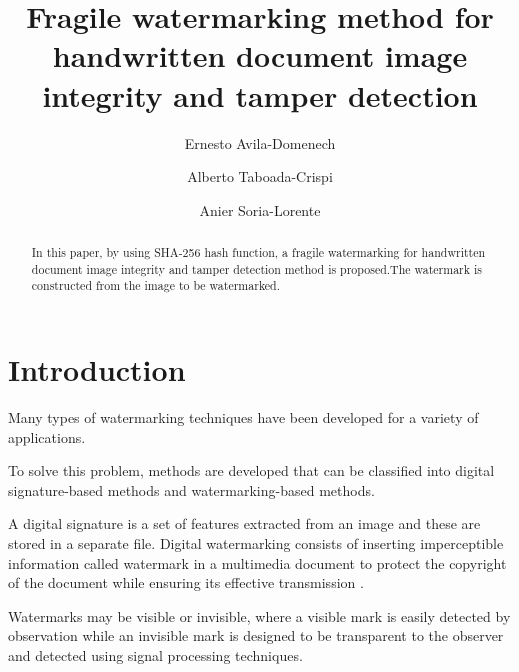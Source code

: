 \documentclass[runningheads]{llncs}
\begin{document}
%
\title{Fragile watermarking method for handwritten document image integrity and tamper detection}
%
%
\author{Ernesto Avila-Domenech \and
Alberto Taboada-Crispi \and
Anier Soria-Lorente}
%
%
%
\maketitle              %
%
\begin{abstract}
In this paper, by using SHA-256 hash function, a fragile watermarking for handwritten document image integrity and tamper detection method is proposed.The watermark is constructed from the image to be watermarked.

\end{abstract}
%
%
%
\section{Introduction}
Many types of watermarking techniques have been developed for a variety of applications.

To solve this problem, methods are developed that can be classified into digital signature-based methods and watermarking-based methods.

A digital signature is a set of features extracted from an image and these are stored in a separate file. Digital watermarking consists of inserting imperceptible information called watermark in a multimedia document to protect the copyright of the document while ensuring its effective transmission \cite{el2014image}.

Watermarks may be visible or invisible, where a visible mark is easily detected by observation while an invisible mark is designed to be transparent to the observer and detected using signal processing techniques.
\end{document}
